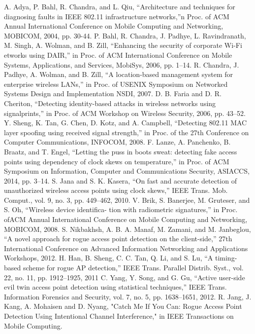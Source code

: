 \documentclass[conference]{IEEEtran}
\begin{document}
\begin{thebibliography}{00}
 A. Adya, P. Bahl, R. Chandra, and L. Qiu, “Architecture and techniques for diagnosing faults in IEEE 802.11 infrastructure networks,”n Proc. of ACM Annual International Conference on Mobile Computing and Networking, MOBICOM, 2004, pp. 30-44.
 P. Bahl, R. Chandra, J. Padhye, L. Ravindranath, M. Singh, A. Wolman, and B. Zill, “Enhancing the security of corporate Wi-Fi etworks using DAIR,” in Proc. of ACM International Conference on Mobile Systems, Applications, and Services, MobiSys, 2006, pp. 1–14.
 R. Chandra, J. Padhye, A. Wolman, and B. Zill, “A location-based management system for enterprise wireless LANs,” in Proc. of USENIX Symposium on Networked Systems Design and Implementation NSDI, 2007.
 D. B. Faria and D. R. Cheriton, “Detecting identity-based attacks in wireless networks using signalprints,” in Proc. of ACM Workshop on Wireless Security, 2006, pp. 43–52.
 Y. Sheng, K. Tan, G. Chen, D. Kotz, and A. Campbell, “Detecting 802.11 MAC layer spoofing using received signal strength,” in Proc. of the 27th Conference on Computer Communications, INFOCOM, 2008.
 F. Lanze, A. Panchenko, B. Braatz, and T. Engel, “Letting the puss in boots sweat: detecting fake access points using dependency of clock skews on temperature,” in Proc. of ACM Symposium on Information, Computer and Communications Security, ASIACCS, 2014, pp. 3–14.
 S. Jana and S. K. Kasera, “On fast and accurate detection of unauthorized wireless access points using clock skews,” IEEE Trans. Mob. Comput., vol. 9, no. 3, pp. 449–462, 2010.
 V. Brik, S. Banerjee, M. Gruteser, and S. Oh, “Wireless device identifica- tion with radiometric signatures,” in Proc. ofACM Annual International Conference on Mobile Computing and Networking, MOBICOM, 2008.
 S. Nikbakhsh, A. B. A. Manaf, M. Zamani, and M. Janbeglou, “A novel approach for rogue access point detection on the client-side,” 27th International Conference on Advanced Information Networking and Applications Workshops, 2012.
 H. Han, B. Sheng, C. C. Tan, Q. Li, and S. Lu, “A timing-based scheme for rogue AP detection,” IEEE Trans. Parallel Distrib. Syst., vol. 22, no. 11, pp. 1912–1925, 2011
 C. Yang, Y. Song, and G. Gu, “Active user-side evil twin access point detection using statistical techniques,” IEEE Trans. Information Forensics and Security, vol. 7, no. 5, pp. 1638–1651, 2012.
 R. Jang, J. Kang, A. Mohaisen and D. Nyang, "Catch Me If You Can: Rogue Access Point Detection Using Intentional Channel Interference," in IEEE Transactions on Mobile Computing.

\end{thebibliography}
\vspace{12pt}
\end{document}
